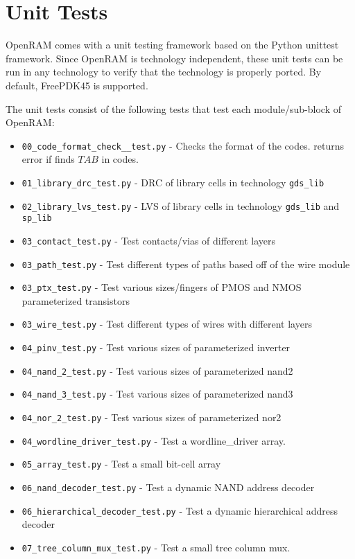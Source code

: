 \section{Unit Tests}
\label{sec:unittests}

OpenRAM comes with a unit testing framework based on the Python
unittest framework. Since OpenRAM is technology independent, these
unit tests can be run in any technology to verify that the technology
is properly ported. By default, FreePDK45 is supported.

The unit tests consist of the following tests that test each module/sub-block of OpenRAM:
\begin{itemize}
\item \verb|00_code_format_check__test.py| - Checks the format of the codes. returns error if finds $TAB$ in codes. 
\item \verb|01_library_drc_test.py| - DRC of library cells in technology \verb|gds_lib|
\item \verb|02_library_lvs_test.py| - LVS of library cells in technology \verb|gds_lib| and \verb|sp_lib| %
\item \verb|03_contact_test.py| - Test contacts/vias of different layers
\item \verb|03_path_test.py| - Test different types of paths based off of the wire module
\item \verb|03_ptx_test.py| - Test various sizes/fingers of PMOS and NMOS parameterized transistors
\item \verb|03_wire_test.py| - Test different types of wires with different layers
\item \verb|04_pinv_test.py|	- Test various sizes of parameterized inverter
\item \verb|04_nand_2_test.py|	- Test various sizes of parameterized nand2
\item \verb|04_nand_3_test.py|	- Test various sizes of parameterized nand3
\item \verb|04_nor_2_test.py|	- Test various sizes of parameterized nor2
\item \verb|04_wordline_driver_test.py|	- Test a wordline\_driver array.
\item \verb|05_array_test.py| - Test a small bit-cell array
\item \verb|06_nand_decoder_test.py|	- Test a dynamic NAND address decoder
\item \verb|06_hierarchical_decoder_test.py|	- Test a dynamic hierarchical address decoder
\item \verb|07_tree_column_mux_test.py| - Test a small tree column mux.

\end{itemize}
